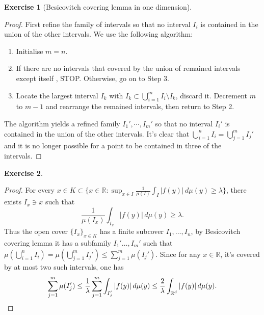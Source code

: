 \documentclass[a4paper]{article}
\newtheorem{ex}{Exercise}[subsection]
\begin{document}
\begin{ex}[Besicovitch covering lemma in one dimension]\end{ex}\begin{proof}
First refine the family of intervals so that no interval $I_i$ is contained in the union of the other intervals.
We use the following algorithm:\begin{enumerate}[label = Step \arabic*., left = 2pt]
    \item Initialise $m = n$.
    \item If there are no intervals that covered by the union of remained intervals except itself , STOP. Otherwise, go on to Step 3.
    \item Locate the largest interval $I_k$ with $I_k \subset \bigcup_{i = 1}^m I_i \setminus I_k$, discard it. 
    Decrement $m$ to $m - 1$ and rearrange the remained intervals, then return to Step 2.
\end{enumerate}
The algorithm yields a refined family $I_1', \cdots, I_m'$ so that no interval $I_i'$ is contained in the union of the 
other intervals. It's clear that $\bigcup_{i = 1}^n I_i = \bigcup_{j = 1}^m  I_j'$ and it is no longer possible for a point 
to be contained in three of the intervals.
\end{proof}

\begin{ex}\end{ex}\begin{proof}
For every $x \in K \subset \{x \in \mathbb{R} : \sup_{x \in I}\frac{1}{\mu(I)}\int_I |f(y)|\,d\mu(y) \geq \lambda\}$, 
there exists $I_x \ni x$ such that $$
\frac{1}{\mu(I_x)}\int_{I_x} |f(y)|\,d\mu(y) \geq \lambda.
$$Thus the open cover $\{I_x\}_{x \in K}$ has a finite subcover $I_1, \dots, I_n$, by Besicovitch covering lemma it 
has a subfamily $I_1' \dots, I_m'$ such that $\mu(\bigcup_{i = 1}^n I_i) = \mu(\bigcup_{j = 1}^m I_j') \leq \sum_{j = 1}^m \mu(I_j')$.
Since for any $x \in \mathbb{R}$, it's covered by at most two such intervals, one has \[
\sum_{j = 1}^m \mu(I_j') \leq \frac{1}{\lambda}\sum_{j = 1}^m \int_{I_j'} |f(y)|\,d\mu(y) \leq \frac{2}{\lambda}
\int_{\mathbb{R}^d}|f(y)|\,d\mu(y).\qedhere
\]
\end{proof}
\end{document}
